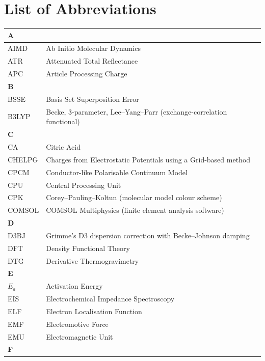 \documentclass[12pt,a4paper]{report}
\begin{document}
\tableofcontents
\listoffigures
\listoftables  

\chapter*{List of Abbreviations}

\begin{center}
\begin{longtable}{p{2.5cm} p{12cm}}
\hline
\multicolumn{2}{l}{\textbf{A}} \\
\hline
AIMD & Ab Initio Molecular Dynamics \\
ATR & Attenuated Total Reflectance \\
APC & Article Processing Charge \\
\hline
\multicolumn{2}{l}{\textbf{B}} \\
\hline
BSSE & Basis Set Superposition Error \\
B3LYP & Becke, 3-parameter, Lee–Yang–Parr (exchange-correlation functional) \\
\hline
\multicolumn{2}{l}{\textbf{C}} \\
\hline
CA & Citric Acid \\
CHELPG & Charges from Electrostatic Potentials using a Grid-based method \\
CPCM & Conductor-like Polarisable Continuum Model \\
CPU & Central Processing Unit \\
CPK & Corey–Pauling–Koltun (molecular model colour scheme) \\
COMSOL & COMSOL Multiphysics (finite element analysis software) \\
\hline
\multicolumn{2}{l}{\textbf{D}} \\
\hline
D3BJ & Grimme's D3 dispersion correction with Becke–Johnson damping \\
DFT & Density Functional Theory \\
DTG & Derivative Thermogravimetry \\
\hline
\multicolumn{2}{l}{\textbf{E}} \\
\hline
\(E_a\) & Activation Energy \\
EIS & Electrochemical Impedance Spectroscopy \\
ELF & Electron Localisation Function \\
EMF & Electromotive Force \\
EMU & Electromagnetic Unit \\
\hline
\multicolumn{2}{l}{\textbf{F}} \\

\end{longtable}
\end{center}
\end{document}
